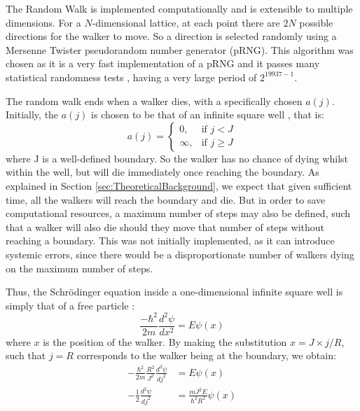 \documentclass[journal]{IEEEtran}
\begin{document}
The Random Walk is implemented computationally  and is extensible
to multiple dimensions. For a $N$-dimensional lattice, at each point there are
$2N$ possible directions for the walker to move. So a direction is selected
randomly using a Mersenne Twister pseudorandom number generator (pRNG). This algorithm
was chosen as it is a very fast implementation of a pRNG  and it
passes many statistical randomness tests , having a very large
period of $2^{19937-1}$.

The random walk ends when a walker dies, with a
specifically chosen $a(j)$. Initially, the $a(j)$ is chosen to be that of an
infinite square well , that is:
\begin{equation}
  \label{eq:squarewell}
    a(j) =
    \begin{cases}
      0,& \text{if } j < J\\
      \infty,& \text{if } j \geq J
    \end{cases}
    \nonumber
\end{equation}
where J is a well-defined boundary. So the walker has no chance of dying whilst
within the well, but will die immediately once reaching the boundary. As
explained in Section \ref{sec:TheoreticalBackground}, we expect that given
sufficient time, all the walkers will reach the boundary and die. But in order
to save computational resources, a maximum number of steps may also be defined,
such that a walker will also die should they move that number of steps without
reaching a boundary. This was not initially implemented, as it can introduce
systemic errors, since there would be a disproportionate number of walkers dying
on the maximum number of steps.

Thus, the Schr\"{o}dinger equation inside a one-dimensional infinite square well
is simply that of a free particle :
\begin{equation}
  \frac{-\hbar^2}{2m}\frac{d^2 \psi}{dx^2} = E\psi(x)
  \nonumber
\end{equation}
where $x$ is the position of the walker. By making the substitution $x = J
\times j/R$, such that $j=R$ corresponds to the walker being at the boundary, we
obtain:
\begin{equation}
  \begin{split}
    -\frac{\hbar^2}{2m}\frac{R^2}{J^2}\frac{d^2\psi}{dj^2} &= E\psi(x)\\
    -\frac{1}{2}\frac{d^2\psi}{dj^2} &= \frac{mJ^2E}{\hbar^2R^2}\psi(x)
  \end{split}
  \nonumber
\end{equation}
\end{document}
